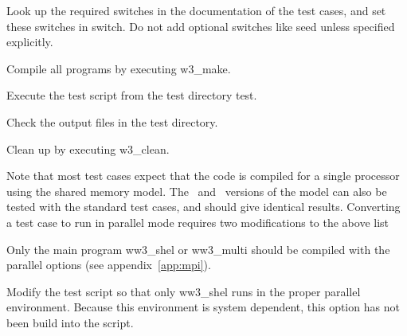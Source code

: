 \begin{list}{)\hfill}
            { \leftmargin 15mm 
             \rightmargin 5mm \itemsep 0mm \parsep 0mm}
\item Look up the required switches in the documentation of the
      test cases, and set these switches in {\file switch}. Do not
      add optional switches like {\F seed} unless specified
      explicitly.
\item Compile all programs by executing {\file w3\_make}.
\item Execute the test script from the test directory {\dir test}.
\item Check the output files in the test directory.
\item Clean up by executing {\file w3\_clean}.
\end{list}

\noindent
Note that most test cases expect that the code is compiled for a single
processor using the shared memory model. The \omp\ and \mpi\ versions of the
model can also be tested with the standard test cases, and should give
identical results. Converting a test case to run in parallel mode requires two
modifications to the above list

\begin{list}{)\hfill}
            { \leftmargin 15mm 
             \rightmargin 5mm \itemsep 0mm \parsep 0mm}
\item Only the main program {\file ww3\_shel} or {\file ww3\_multi} should be
      compiled with the parallel options (see appendix~\ref{app:mpi}).
\item Modify the test script so that only {\file ww3\_shel} runs in the
      proper parallel environment. Because this environment is system
      dependent, this option has not been build into the script.
\end{list}


\bpage
